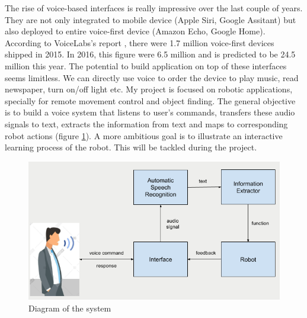 The rise of voice-based interfaces is really impressive over the last couple of years. They are not only integrated to mobile device (Apple Siri, Google Assitant) but also deployed to entire voice-first device (Amazon Echo, Google Home). According to VoiceLabs's report \cite{VoiceLabs:2017}, there were 1.7 million voice-first devices shipped in 2015. In 2016, this figure were 6.5 million and is predicted to be 24.5 million this year. The potential to build application on top of these interfaces seems limitless. We can directly use voice to order the device to play music, read newspaper, turn on/off light etc. My project is focused on robotic applications, specially for remote movement control and object finding. The general objective is to build a voice system that listens to user's commands, transfers these audio signals to text, extracts the information from text and maps to corresponding robot actions (figure \ref{fig:diagramSystem}). A more ambitious goal is to illustrate an interactive learning process of the robot. This will be tackled during the project.
\begin{figure}[tb]
\centering
\includegraphics[width = 0.7\hsize]{./figures/diagramSystem}
\caption{Diagram of the system}
\label{fig:diagramSystem}
\end{figure}


%
%
